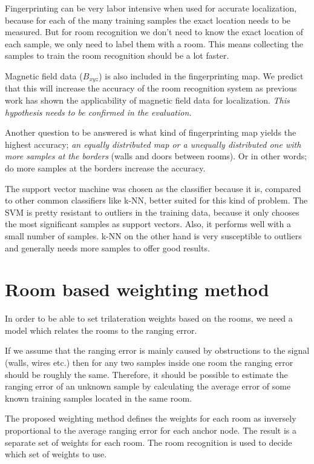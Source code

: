 Fingerprinting can be very labor intensive when used for accurate localization, because for each of the many training samples the exact location needs to be measured. But for room recognition we don't need to know the exact location of each sample, we only need to label them with a room. This means collecting the samples to train the room recognition should be a lot faster.

Magnetic field data ($B_{xyz}$) is also included in the fingerprinting map. We predict that this will increase the accuracy of the room recognition system as previous work has shown the applicability of magnetic field data for localization. \emph{This hypothesis needs to be confirmed in the evaluation.}

Another question to be answered is what kind of fingerprinting map yields the highest accuracy; \emph{an equally distributed map or a unequally distributed one with more samples at the borders }(walls and doors between rooms). Or in other words; do more samples at the borders increase the accuracy.

The support vector machine was chosen as the classifier because it is, compared to other common classifiers like k-NN, better suited for this kind of problem. The SVM is pretty resistant to outliers in the training data, because it only chooses the most significant samples as support vectors. Also, it performs well with a small number of samples. k-NN on the other hand is very susceptible to outliers and generally needs more samples to offer good results.

\section{Room based weighting method}
\label{WeightingModelDefinition}
In order to be able to set trilateration weights based on the rooms, we need a model which relates the rooms to the ranging error.

If we assume that the ranging error is mainly caused by obstructions to the signal (walls, wires etc.) then for any two samples inside one room the ranging error should be roughly the same. Therefore, it should be possible to estimate the ranging error of an unknown sample by calculating the average error of some known training samples located in the same room.

The proposed weighting method defines the weights for each room as inversely proportional to the average ranging error for each anchor node. The result is a separate set of weights for each room. The room recognition is used to decide which set of weights to use.

